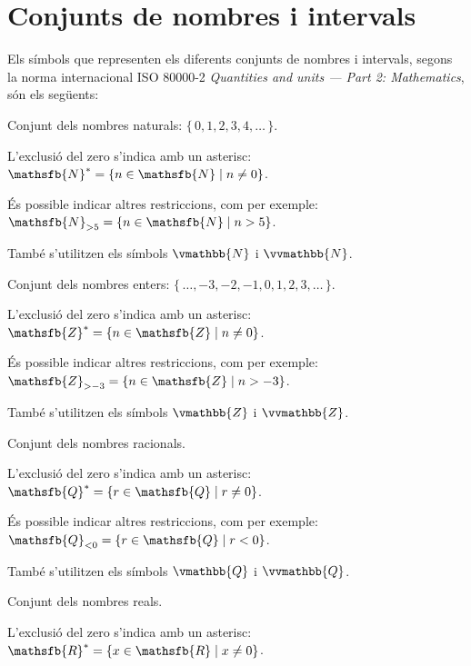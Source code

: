 \section*{Conjunts de nombres i intervals} 

Els símbols que representen els diferents conjunts de nombres i intervals, segons la norma internacional ISO 80000-2 
\textit{Quantities and units --- Part 2: Mathematics}, són els següents:

\begin{list}{}
{\setlength{\labelwidth}{15mm} \setlength{\leftmargin}{20mm}
\setlength{\labelsep}{5mm}}
	 \item[$\mathsfb{N}$] Conjunt dels nombres naturals: $\{\,0,1,2,3,4,\ldots\,\}$. 
	 
	 L'exclusió del zero s'indica amb un asterisc: $\mathsfb{N}^* = \{ n \in \mathsfb{N} \mid n \ne 0 \}$. 
	 
	 És possible indicar altres restriccions, com per exemple:  $\mathsfb{N}_{> 5} = \{ n \in \mathsfb{N} \mid n > 5\}$. 
	 
	 També s'utilitzen els símbols $\vmathbb{N}$ i  $\vvmathbb{N}$.
	 
	 \item[$\mathsfb{Z}$] Conjunt dels nombres enters: $\{\,\ldots,-3,-2,-1,0,1,2,3,\ldots\,\}$.  
	 
	 L'exclusió del zero s'indica amb un asterisc: $\mathsfb{Z}^* = \{ n \in \mathsfb{Z} \mid n \ne 0 \}$. 
	 
	 És possible indicar altres restriccions, com per exemple:  $\mathsfb{Z}_{> -3} = \{ n \in \mathsfb{Z} \mid n > -3\}$.     
	 
	 També s'utilitzen els símbols $\vmathbb{Z}$ i $\vvmathbb{Z}$.
    
	 \item[$\mathsfb{Q}$] Conjunt dels nombres racionals. 
	 
	 L'exclusió del zero s'indica amb un asterisc: $\mathsfb{Q}^* = \{ r \in \mathsfb{Q} \mid r \ne 0 \}$. 
	 
	 És possible indicar altres restriccions, com per exemple:  $\mathsfb{Q}_{< 0} = \{ r \in \mathsfb{Q} \mid r < 0 \}$. 
	 
	 També s'utilitzen els símbols $\vmathbb{Q}$ i $\vvmathbb{Q}$.
	 
	 \item[$\mathsfb{R}$] Conjunt dels nombres reals. 
	 
	 L'exclusió del zero s'indica amb un asterisc: $\mathsfb{R}^* = \{ x \in \mathsfb{R} \mid x \ne 0 \}$. 
	 

\end{list}
